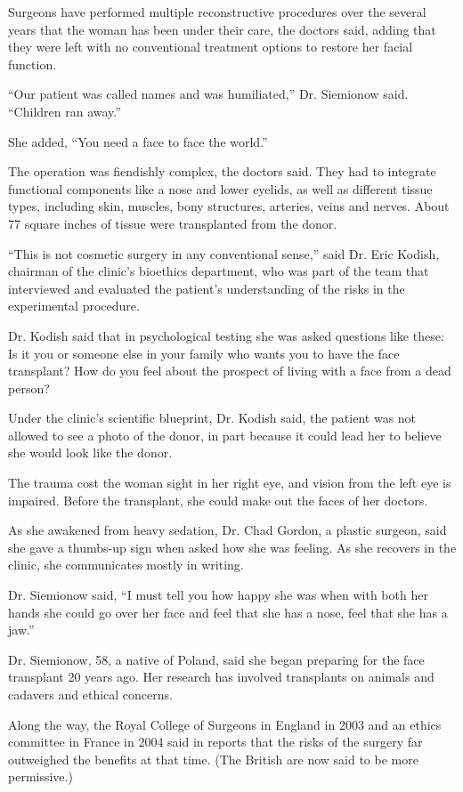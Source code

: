 Surgeons have performed multiple reconstructive procedures over the
several years that the woman has been under their care, the doctors
said, adding that they were left with no conventional treatment options
to restore her facial function.

``Our patient was called names and was humiliated,'' Dr. Siemionow said.
``Children ran away.''

She added, ``You need a face to face the world.''

The operation was fiendishly complex, the doctors said. They had to
integrate functional components like a nose and lower eyelids, as well
as different tissue types, including skin, muscles, bony structures,
arteries, veins and nerves. About 77 square inches of tissue were
transplanted from the donor.

``This is not cosmetic surgery in any conventional sense,'' said Dr.
Eric Kodish, chairman of the clinic's bioethics department, who was part
of the team that interviewed and evaluated the patient's understanding
of the risks in the experimental procedure.

Dr. Kodish said that in psychological testing she was asked questions
like these: Is it you or someone else in your family who wants you to
have the face transplant? How do you feel about the prospect of living
with a face from a dead person?

Under the clinic's scientific blueprint, Dr. Kodish said, the patient
was not allowed to see a photo of the donor, in part because it could
lead her to believe she would look like the donor.

The trauma cost the woman sight in her right eye, and vision from the
left eye is impaired. Before the transplant, she could make out the
faces of her doctors.

As she awakened from heavy sedation, Dr. Chad Gordon, a plastic surgeon,
said she gave a thumbs-up sign when asked how she was feeling. As she
recovers in the clinic, she communicates mostly in writing.

Dr. Siemionow said, ``I must tell you how happy she was when with both
her hands she could go over her face and feel that she has a nose, feel
that she has a jaw.''

Dr. Siemionow, 58, a native of Poland, said she began preparing for the
face transplant 20 years ago. Her research has involved transplants on
animals and cadavers and ethical concerns.

Along the way, the Royal College of Surgeons in England in 2003 and an
ethics committee in France in 2004 said in reports that the risks of the
surgery far outweighed the benefits at that time. (The British are now
said to be more permissive.)

